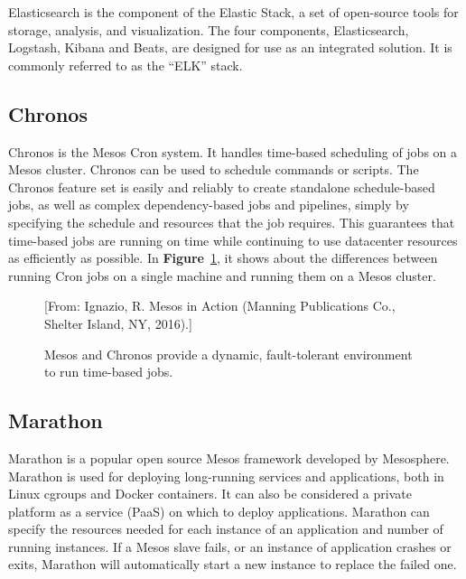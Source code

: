 \documentclass[12pt,oneside,openright,a4paper]{cpe-english-project}
\begin{document}
Elasticsearch is the component of the Elastic Stack, a set of open-source tools for storage, analysis, and visualization. The four components, Elasticsearch, Logstash, Kibana and Beats, are designed for use as an integrated solution. It is commonly referred to as the “ELK” stack.\cite{elasticsearch}

\subsection{Chronos}
Chronos is the Mesos Cron system. It handles time-based scheduling of jobs on a Mesos cluster. Chronos can be used to schedule commands or scripts. The Chronos feature set is easily and reliably to create standalone schedule-based jobs, as well as complex dependency-based jobs and pipelines, simply by specifying the schedule and resources that the job requires. This guarantees that time-based jobs are running on time while continuing to use datacenter resources as efficiently as possible. In \textbf{Figure}~\ref{fig:chronos}, it shows about the differences between running Cron jobs on a single machine and running them on a Mesos cluster.\cite{mesosInAction}

\begin{figure}[!h]\centering
  \setlength{\fboxrule}{0mm} %
  \setlength{\fboxsep}{0cm}
  \caption{Mesos and Chronos provide a dynamic, fault-tolerant environment to run time-based jobs.}\label{fig:chronos}
  [From: Ignazio, R. Mesos in Action (Manning Publications Co., Shelter Island, NY, 2016).]
\end{figure}

\subsection{Marathon}
Marathon is a popular open source Mesos framework developed by Mesosphere. Marathon is used for deploying long-running services and applications, both in Linux cgroups and Docker containers. It can also be considered a private platform as a service (PaaS) on which to deploy applications. Marathon can specify the resources needed for each instance of an application and number of running instances. If a Mesos slave fails, or an instance of application crashes or exits, Marathon will automatically start a new instance to replace the failed one.
\end{document}

